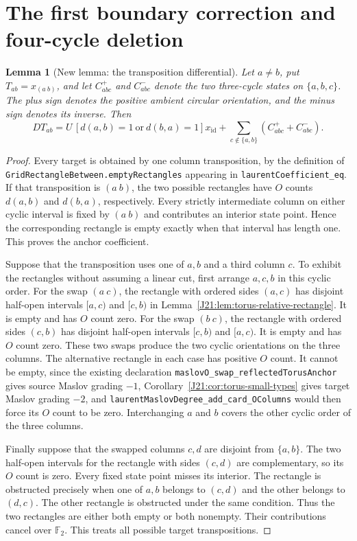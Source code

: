 \documentclass[11pt,oneside]{report}
\newtheorem{lemma}[theorem]{Lemma}
\theoremstyle{definition}
\numberwithin{equation}{section}
\newcommand{\decl}[1]{\textnormal{\nolinkurl{#1}}}
\begin{document}
\section{The first boundary correction and four-cycle deletion}
\label{J21:sec:torus-first-identities}
\begin{lemma}[New lemma: the transposition differential]
\label{J21:lem:torus-transposition-differential}
Let $a\ne b$, put $T_{ab}=x_{(a\ b)}$, and let
$C_{abc}^{+}$ and $C_{abc}^{-}$ denote the two three-cycle states on
$\{a,b,c\}$. The plus sign denotes the positive ambient
circular orientation, and the minus sign denotes its inverse. Then
\[
 D T_{ab}
 =U\,[d(a,b)=1\ \text{or}\ d(b,a)=1]x_{\mathrm{id}}
   +\sum_{c\notin\{a,b\}}(C_{abc}^{+}+C_{abc}^{-}).
\]
\end{lemma}
\begin{proof}
Every target is obtained by one column transposition, by the definition of
\decl{GridRectangleBetween.emptyRectangles} appearing in
\decl{laurentCoefficient_eq}.
If that transposition is $(a\ b)$, the two possible rectangles have
$O$ counts $d(a,b)$ and $d(b,a)$, respectively. Every strictly intermediate
column on either cyclic interval is fixed by $(a\ b)$ and contributes an
interior state point. Hence the corresponding rectangle is empty exactly
when that interval has length one. This proves the anchor coefficient.

Suppose that the transposition uses one of $a,b$ and a third column $c$.
To exhibit the rectangles without assuming a linear cut, first arrange
$a,c,b$ in this cyclic order. For the swap $(a\ c)$, the rectangle with
ordered sides $(a,c)$ has disjoint half-open intervals $[a,c)$ and $[c,b)$
in Lemma~\ref{J21:lem:torus-relative-rectangle}. It is empty and has $O$ count
zero. For the swap $(b\ c)$, the rectangle with ordered sides $(c,b)$ has
disjoint half-open intervals $[c,b)$ and $[a,c)$. It is empty and has $O$
count zero. These two swaps produce the two cyclic orientations on the
three columns. The alternative rectangle in each case has positive $O$
count. It cannot be empty, since the existing declaration
\decl{maslovO_swap_reflectedTorusAnchor} gives source Maslov grading
$-1$, Corollary~\ref{J21:cor:torus-small-types} gives target Maslov grading $-2$,
and \decl{laurentMaslovDegree_add_card_OColumns} would then force its
$O$ count to be zero. Interchanging $a$ and $b$ covers the other cyclic
order of the three columns.

Finally suppose that the swapped columns $c,d$ are disjoint from
$\{a,b\}$. The two half-open intervals for the rectangle with sides
$(c,d)$ are complementary, so its $O$ count is zero. Every fixed state
point misses its interior. The rectangle is obstructed precisely when
one of $a,b$ belongs to $(c,d)$ and the other belongs to $(d,c)$.
The other rectangle is obstructed under the same condition. Thus the two
rectangles are either both empty or both nonempty. Their contributions
cancel over $\mathbb F_2$. This treats all possible target transpositions.
\end{proof}
\end{document}
